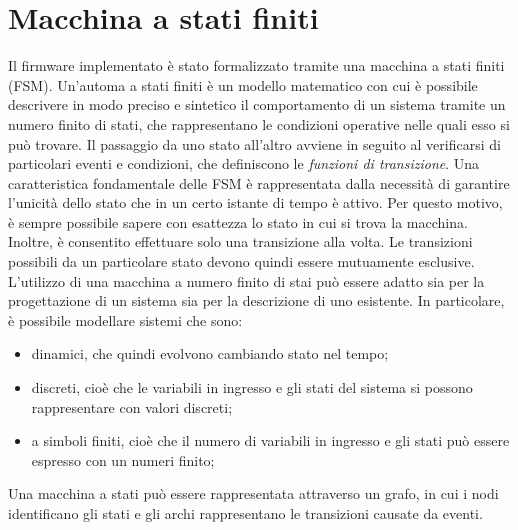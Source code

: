 \section{Macchina a stati finiti} \label{cap:FSM}
Il firmware implementato è stato formalizzato tramite una macchina a stati finiti (FSM). Un'automa a stati finiti è un modello matematico con cui è possibile descrivere in modo preciso e sintetico il comportamento di un sistema tramite un numero finito di stati, che rappresentano le condizioni operative nelle quali esso si può trovare. Il passaggio da uno stato all'altro avviene in seguito al verificarsi di particolari eventi e condizioni, che definiscono le \textit{funzioni di transizione}. Una caratteristica fondamentale delle FSM è rappresentata dalla necessità di garantire l'unicità dello stato che in un certo istante di tempo è attivo. Per questo motivo, è sempre possibile sapere con esattezza lo stato in cui si trova la macchina. Inoltre, è consentito effettuare solo una transizione alla volta. Le transizioni possibili da un particolare stato devono quindi essere mutuamente esclusive.
L'utilizzo di una macchina a numero finito di stai può essere adatto sia per la progettazione di un sistema sia per la descrizione di uno esistente. In particolare, è possibile modellare sistemi che sono:
\begin{itemize}
	\item dinamici, che quindi evolvono cambiando stato nel tempo;
	\item discreti, cioè che le variabili in ingresso e gli stati del sistema si possono rappresentare con valori discreti;
	\item a simboli finiti, cioè che il numero di variabili in ingresso e gli stati può essere espresso con un numeri finito;
\end{itemize}
Una macchina a stati può essere rappresentata attraverso un grafo, in cui i nodi identificano gli stati e gli archi rappresentano le transizioni causate da eventi. 

